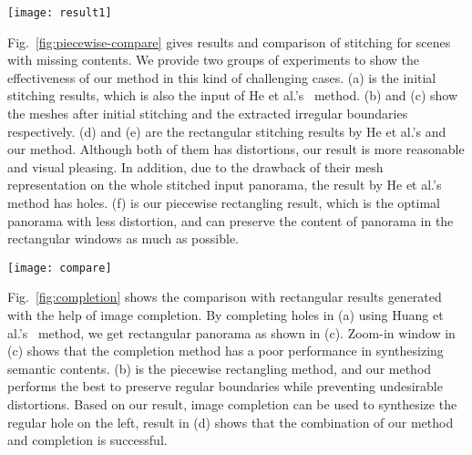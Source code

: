 \documentclass[10pt,journal,compsoc]{IEEEtran}
\begin{document}
 \begin{figure*} %
  \centering
  \texttt{[image: result1]}
  \caption{Comparison with state-of-the-art methods. (a) Chen's~\cite{conf/eccv/ChenC16} stitching with global prior. (b) He et al.'s~\cite{journals/tog/HeC013} rectangling stitching. (c) and (d) are Our piecewise rectangling results in the $1_{st}$ iteration with and without line preserving). (e) our final stitching results after several iterations. } \label{fig:result_office}
\end{figure*}

Fig.~\ref{fig:piecewise-compare} gives results and comparison of stitching for scenes with missing contents. We provide two groups of experiments to show the effectiveness of our method in this kind of challenging cases. (a) is the initial stitching results, which is also the input of He et al.'s~\cite{journals/tog/HeC013} method. (b) and (c) show the meshes after initial stitching and the extracted irregular boundaries respectively.
(d) and (e) are the rectangular stitching results by He et al.'s and our method. Although both of them has distortions, our result is more reasonable and visual pleasing. In addition,  due to the drawback of their mesh representation on the whole stitched input panorama, the result by He et al.'s method has holes. (f) is our piecewise rectangling result, which is the optimal panorama with less distortion, and can preserve the content of panorama in the rectangular windows as much as possible.

\begin{figure*}
  \centering
  \texttt{[image: compare]}
  \caption{Results and comparison of stitching with missing contents. There are two sets of results, and each set is as follows: (a) Initial stitching result with irregular boundaries. (b)  Warped meshes of initial stitching. (c) Irregular boundary extraction. (d) and (e) are rectangling stitching by He's~\cite{journals/tog/HeC013} and our method respectively. (f) our piecewise rectangular stitching result.} \label{fig:piecewise-compare}
\end{figure*}

Fig.~\ref{fig:completion} shows the comparison with rectangular results generated with the help of image completion. By completing holes in (a) using Huang et al.'s~\cite{journals/tog/HuangKAK14} method, we get rectangular panorama as shown in (c). Zoom-in window in (c) shows that the completion method has a poor performance in synthesizing semantic contents. (b) is the piecewise rectangling method, and our method performs the best to preserve regular boundaries while preventing undesirable distortions. Based on our result, image completion can be used to synthesize the regular hole on the left, result in (d) shows that the combination of our method and completion is successful.
\end{document}
